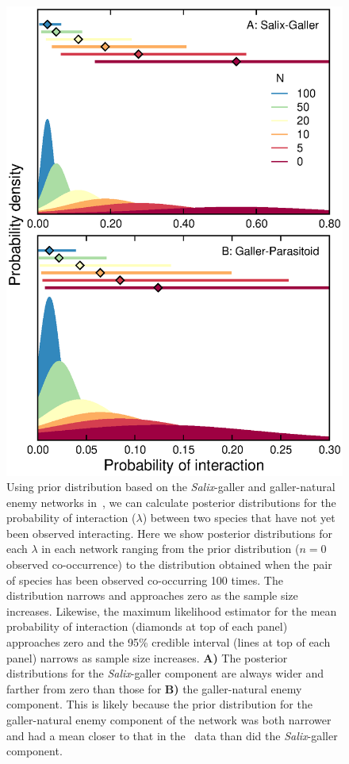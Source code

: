 \documentclass[12pt]{article}
\begin{document}
      \begin{figure}[h!]
        \caption{Using prior distribution based on the \emph{Salix}-galler and galler-natural enemy networks in~\citet{Barbour2016}, we can calculate posterior distributions for the probability of interaction ($\lambda$) between two species that have not yet been observed interacting. Here we show posterior distributions for each $\lambda$ in each network ranging from the prior distribution ($n=0$ observed co-occurrence) to the distribution obtained when the pair of species has been observed co-occurring 100 times. The distribution narrows and approaches zero as the sample size increases. Likewise, the maximum likelihood estimator for the mean probability of interaction (diamonds at top of each panel) approaches zero and the 95\% credible interval (lines at top of each panel) narrows as sample size increases. \textbf{A)} The posterior distributions for the \emph{Salix}-galler component are always wider and farther from zero than those for \textbf{B)} the galler-natural enemy component. This is likely because the prior distribution for the galler-natural enemy component of the network was both narrower and had a mean closer to that in the~\citet{Kopelke2017} data than did the \emph{Salix}-galler component.}
        \label{Salix_pdfs}
        \begin{center}
        \includegraphics*[width=.6\textwidth]{figures/Salix_Galler_pdfs_increasing_N.eps}
        \end{center}
        \end{figure}
\end{document}
